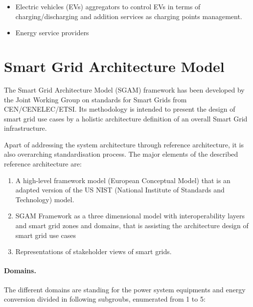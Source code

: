 \documentclass[a4paper,11pt,twoside,openright]{report}
\begin{document}
\begin{itemize}
	\item Electric vehicles (EVs) aggregators to control EVs in terms of charging/discharging and addition services as charging points management.
	\item Energy service providers 
\end{itemize} 

\section{Smart Grid Architecture Model}
\label{sec:SGAM}

The Smart Grid Architecture Model (SGAM) framework has been developed by the Joint Working Group on standards for Smart Grids from CEN/CENELEC/ETSI. Its methodology is intended to present the design of smart grid use cases by a holistic architecture definition of an overall Smart Grid infrastructure.

Apart of addressing the system architecture through reference architecture, it is also overarching standardisation process. The major elements of the described reference architecture are:
\begin{enumerate}
	\item A high-level framework model (European Conceptual Model) that is an adapted version of the US NIST (National Institute of Standards and Technology) model.
	\item SGAM Framework as a three dimensional model with interoperability layers and smart grid zones and domains, that is assisting the architecture design of smart grid use cases
	\item Representations of stakeholder views of smart grids.
\end{enumerate}

\paragraph{Domains.} The different domains are standing for the power system equipments and energy conversion divided in following subgroubs, enumerated from 1 to 5:
\end{document}

